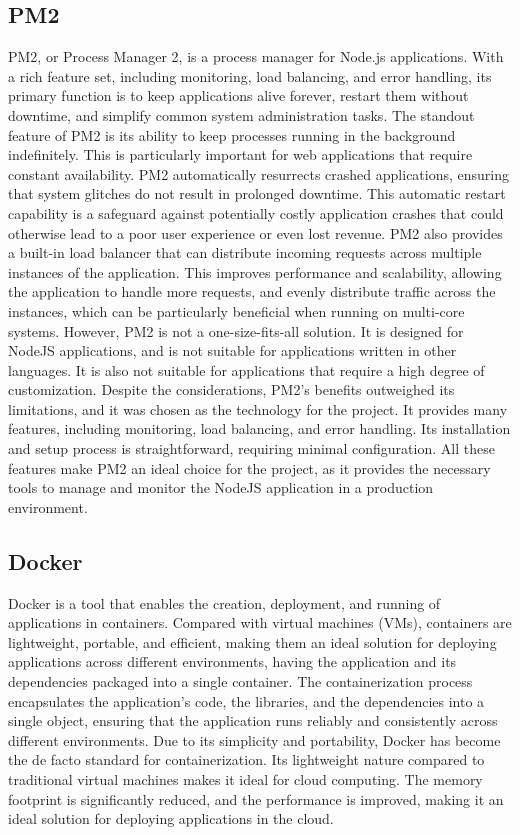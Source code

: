 \subsection{PM2}
PM2, or Process Manager 2, is a process manager for Node.js applications.
With a rich feature set, including monitoring, load balancing, and error handling, its primary function is to keep applications alive forever, restart them without downtime, and simplify common system administration tasks.
The standout feature of PM2 is its ability to keep processes running in the background indefinitely. This is particularly important for web applications that require constant availability. PM2 automatically resurrects crashed applications, ensuring that system glitches do not result in prolonged downtime.\cite{pm2}
This automatic restart capability is a safeguard against potentially costly application crashes that could otherwise lead to a poor user experience or even lost revenue. \cite{pm2}
PM2 also provides a built-in load balancer that can distribute incoming requests across multiple instances of the application. This improves performance and scalability, allowing the application to handle more requests, and evenly distribute traffic across the instances, which can be particularly beneficial when running on multi-core systems. \cite{pm2LoadBalancing}
However, PM2 is not a one-size-fits-all solution. It is designed for NodeJS applications, and is not suitable for applications written in other languages. It is also not suitable for applications that require a high degree of customization. \cite{pm2}
Despite the considerations, PM2's benefits outweighed its limitations, and it was chosen as the technology for the project. It provides many features, including monitoring, load balancing, and error handling.
Its installation and setup process is straightforward, requiring minimal configuration. 
All these features make PM2 an ideal choice for the project, as it provides the necessary tools to manage and monitor the NodeJS application in a production environment.\cite{tilkov}

\subsection{Docker}

Docker is a tool that enables the creation, deployment, and running of applications in containers. 
Compared with virtual machines (VMs), containers are lightweight, portable, and efficient, making them an ideal solution for deploying applications across different environments, 
having the application and its dependencies packaged into a single container. The containerization process encapsulates the application's code, the libraries, and the dependencies 
into a single object, ensuring that the application runs reliably and consistently across different environments. \cite{merkel2014docker}
Due to its simplicity and portability, Docker has become the de facto standard for containerization. Its lightweight nature compared to traditional virtual machines makes it ideal for cloud computing. 
The memory footprint is significantly reduced, and the performance is improved, making it an ideal solution for deploying applications in the cloud. \cite{merkel2014docker}

